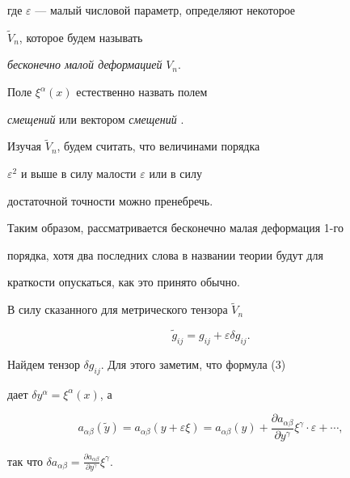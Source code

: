 где $\varepsilon $ --- малый числовой параметр, определяют некоторое 


$\widetilde{V}_n$, которое будем называть 


{\it бесконечно малой деформацией} $V_n$.


Поле $\xi^\alpha (x)$ естественно назвать полем 


{\it смещений} или вектором {\it смещений} \cite{ga89}.





Изучая $\widetilde{V}_n$, будем считать, что величинами порядка 


$\varepsilon^2$ и выше в силу малости $\varepsilon $ или в силу


достаточной точности можно пренебречь.





Таким образом, рассматривается бесконечно малая деформация 1-го


порядка, хотя два последних слова в названии теории будут для


краткости опускаться, как это принято обычно.





В силу сказанного для метрического тензора $\widetilde{V}_n$


\begin{equation}


\widetilde{g}_{ij}=g_{ij}+\varepsilon \delta g_{ij}.


\end{equation}


Найдем тензор $\delta g_{ij}$. Для этого заметим, что формула (3)


дает $\delta y^\alpha =\xi^\alpha (x)$, а 


$$


a_{\alpha \beta }(\widetilde{y})=a_{\alpha \beta }(y+\varepsilon 


\xi)=a_{\alpha \beta }(y)+


\frac{\partial a_{\alpha \beta }}{\partial y^\gamma }


\xi^\gamma \cdot \varepsilon +\dotsb,


$$


так что $\delta a_{\alpha \beta }=


\frac{\partial a_{\alpha \beta }}{\partial y^\gamma }\xi^\gamma$. 





